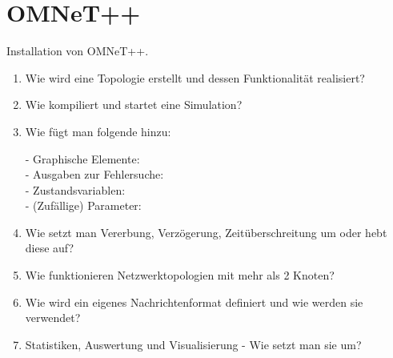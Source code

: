 \documentclass[11pt]{article}
\begin{document}
    \section{OMNeT++}
    Installation von OMNeT++.
    \begin{enumerate}[$\circ$]
        \item Wie wird eine Topologie erstellt und dessen Funktionalität realisiert?


        \item Wie kompiliert und startet eine Simulation?


        \item Wie fügt man folgende hinzu:
        \begin{addmargin}[1em]{1em}
            - Graphische Elemente: \\
            - Ausgaben zur Fehlersuche: \\
            - Zustandsvariablen: \\
            - (Zufällige) Parameter:
        \end{addmargin}


        \item Wie setzt man Vererbung, Verzögerung, Zeitüberschreitung um oder hebt diese auf?


        \item Wie funktionieren Netzwerktopologien mit mehr als 2 Knoten?


        \item Wie wird ein eigenes Nachrichtenformat definiert und wie werden sie verwendet?


        \item Statistiken, Auswertung und Visualisierung - Wie setzt man sie um?
    \end{enumerate}
\end{document}
